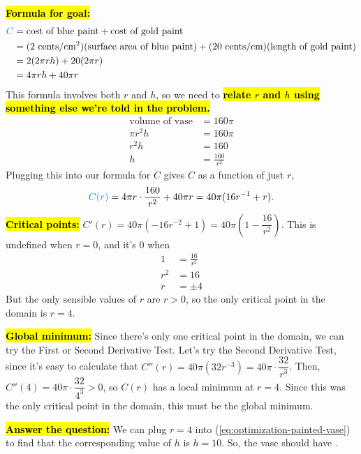 \documentclass{article}
\newcommand{\highlight}[1]{\boldmath\hl{\textbf{#1}}\unboldmath}
\newcommand{\goal}[1]{\textbf{\textcolor{skyblue}{#1}}}
\theoremstyle{theorem}
\begin{document}
\begin{enumerate}
\begin{solution}
    \highlight{Formula for goal:}
    \begin{align*}
      \goal{$C$} &= \text{cost of blue paint} + \text{cost of gold paint} \\
      &= (2 \text{ cents/cm$^2$})(\text{surface area of blue paint}) + (20 \text{ cents/cm})(\text{length of gold paint}) \\
      &= 2 (2 \pi r h) + 20 (2 \pi r) \\
      &= 4 \pi r h + 40 \pi r
    \end{align*}
    This formula involves both $r$ and $h$, so we need to \highlight{relate $r$ and $h$ using something else we're told in the problem.}
    \begin{align}
      \text{volume of vase} &= 160 \pi \nonumber \\
      \pi r^2 h &= 160 \pi \nonumber \\
      r^2 h &= 160 \nonumber \\
      h &= \frac{160}{r^2} \label{eq:optimization-painted-vase}
    \end{align}
    Plugging this into our formula for $C$ gives $C$ as a function of just
    $r$,
    \[ \goal{$C(r)$} = 4 \pi r \cdot \frac{160}{r^2} + 40 \pi r = 40 \pi ( 16 r^{-1} + r).\]%
    \highlight{Critical points:} $\displaystyle C'(r) = 40 \pi (- 16r^{-2} + 1) = 40 \pi \left( 1 - \dfrac{16}{r^2} \right)$. This is undefined when $r = 0$, and it's 0 when 
    \begin{align*}
      1 &= \frac{16}{r^2} \\
      r^2 &= 16 \\
      r &= \pm 4
    \end{align*}
    But the only sensible values of $r$ are $r > 0$, so the only critical point in the domain is $r = 4$.

    \highlight{Global minimum:} Since there's only one critical point in the domain, we can try the First or Second Derivative Test. Let's try the Second Derivative Test, since it's easy to calculate that $C''(r) = 40 \pi (32 r^{-3}) = 40 \pi \cdot \dfrac{32}{r^3}$. Then, $C''(4) = 40 \pi \cdot \dfrac{32}{4^3} > 0$, so $C(r)$ has a local minimum at $r = 4$. Since this was the only critical point in the domain, this must be the global minimum.

    \highlight{Answer the question:} We can plug $r = 4$ into (\ref{eq:optimization-painted-vase}) to find that the corresponding value of $h$ is $h = 10$. So, the vase should have .
  \end{solution}


\end{enumerate}
\end{document}
